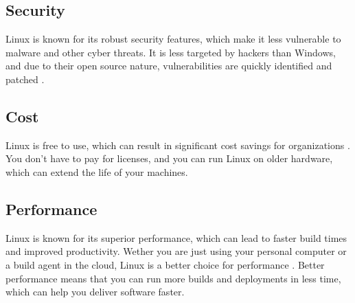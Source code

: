 \subsection{Security}
Linux is known for its robust security features, which make it less vulnerable to malware and other cyber threats.
It is less targeted by hackers than Windows, and due to their open source nature, vulnerabilities are quickly identified and patched \autocite{Singh2023}.


\subsection{Cost}
Linux is free to use, which can result in significant cost savings for organizations \autocite{Singh2023}. 
You don't have to pay for licenses, and you can run Linux on older hardware, which can extend the life of your machines.


\subsection{Performance}
Linux is known for its superior performance, which can lead to faster build times and improved productivity.
Wether you are just using your personal computer or a build agent in the cloud, Linux is a better choice for performance \autocite{Singh2023}.
Better performance means that you can run more builds and deployments in less time, which can help you deliver software faster.

